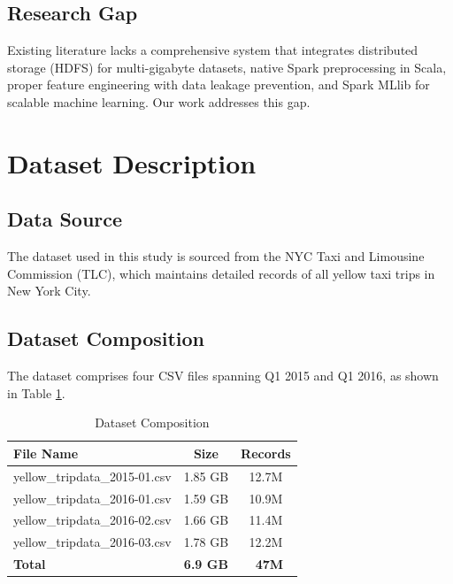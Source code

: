 \documentclass[conference]{IEEEtran}
\begin{document}
\subsection{Research Gap}

Existing literature lacks a comprehensive system that integrates distributed storage (HDFS) for multi-gigabyte datasets, native Spark preprocessing in Scala, proper feature engineering with data leakage prevention, and Spark MLlib for scalable machine learning. Our work addresses this gap.

\section{Dataset Description}

\subsection{Data Source}

The dataset used in this study is sourced from the NYC Taxi and Limousine Commission (TLC), which maintains detailed records of all yellow taxi trips in New York City.

\subsection{Dataset Composition}

The dataset comprises four CSV files spanning Q1 2015 and Q1 2016, as shown in Table \ref{tab:dataset}.

\begin{table}[htbp]
\caption{Dataset Composition}
\begin{center}
\begin{tabular}{|l|c|c|}
\hline
\textbf{File Name} & \textbf{Size} & \textbf{Records} \\
\hline
yellow\_tripdata\_2015-01.csv & 1.85 GB & 12.7M \\
yellow\_tripdata\_2016-01.csv & 1.59 GB & 10.9M \\
yellow\_tripdata\_2016-02.csv & 1.66 GB & 11.4M \\
yellow\_tripdata\_2016-03.csv & 1.78 GB & 12.2M \\
\hline
\textbf{Total} & \textbf{6.9 GB} & \textbf{~47M} \\
\hline
\end{tabular}
\label{tab:dataset}
\end{center}
\end{table}
\end{document}
